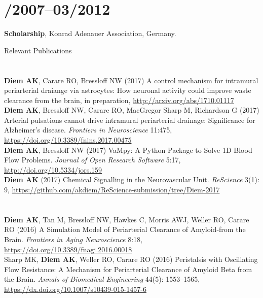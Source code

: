 \documentclass[margin,line,10pt]{res}
\begin{document}
\begin{resume}
\section{/2007--03/2012}{\bf Scholarship}, Konrad Adenauer Association, Germany.\\        

\vspace*{-.2in}

{\sc Relevant Publications}\\
\vspace*{-.35in}
\section{}

{\bf Diem AK}, Carare RO, Bressloff NW (2017) A control mechanism for intramural periarterial draiange via astrocytes: How neuronal activity could improve waste clearance from the brain, in preparation, \url{http://arxiv.org/abs/1710.01117}\\
{\bf Diem AK}, Bressloff NW, Carare RO, MacGregor Sharp M, Richardson G (2017) Arterial pulsations cannot drive intramural periarterial drainage: Significance for Alzheimer's disease. \textit{Frontiers in Neuroscience} 11:475, \url{https://doi.org/10.3389/fnins.2017.00475}\\
{\bf Diem AK}, Bressloff NW (2017) VaMpy: A Python Package to Solve 1D Blood Flow Problems. {\em Journal of Open Research Software} 5:17, \url{http://doi.org/10.5334/jors.159}\\
{\bf Diem AK} (2017) Chemical Signalling in the Neurovascular Unit. \textit{ReScience} 3(1): 9, \url{https://github.com/akdiem/ReScience-submission/tree/Diem-2017}\\
\vspace*{-.35in}
\section{}
{\bf Diem AK}, Tan M, Bressloff NW, Hawkes C, Morris AWJ, Weller RO, Carare RO (2016) A Simulation Model of Periarterial Clearance of Amyloid-\textbeta from the Brain. \textit{Frontiers in Aging Neuroscience} 8:18, \url{https://doi.org/10.3389/fnagi.2016.00018}\\
Sharp MK, {\bf Diem AK}, Weller RO, Carare RO (2016) Peristalsis with Oscillating Flow Resistance: A Mechanism for Periarterial Clearance of Amyloid Beta from the Brain. \textit{Annals of Biomedical Engineering} 44(5): 1553--1565, \url{https://dx.doi.org/10.1007/s10439-015-1457-6}\\

\end{resume}
\end{document}
